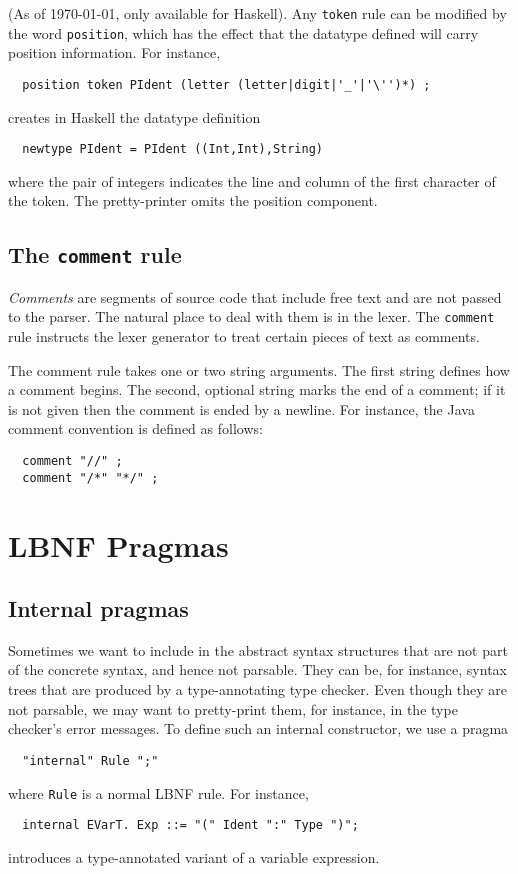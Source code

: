 \documentclass[10pt]{article}
\begin{document}
\label{reg}\label{postoken}

(As of \today, only available for Haskell).
Any {\tt token} rule can be modified by the word
{\tt position}, which has the effect that the
datatype defined will carry position information.
For instance,
\begin{verbatim}
  position token PIdent (letter (letter|digit|'_'|'\'')*) ;
\end{verbatim}
creates in Haskell the datatype definition
\begin{verbatim}
  newtype PIdent = PIdent ((Int,Int),String)
\end{verbatim}
where the pair of integers indicates the line and column of
the first character of the token. The pretty-printer omits
the position component.




\subsection{The {\tt comment} rule}

\textit{Comments} are segments of source code that include free
text and are not passed to the parser. The natural place
to deal with them is in the lexer. The {\tt comment} rule instructs the
lexer generator to treat certain pieces of text as comments. 

The comment rule takes one or two string arguments. The first
string defines how a comment begins.
The second, optional string marks the end of a comment;
if it is not given then the comment is ended by a newline.
For instance, the Java comment convention is defined as follows:
\begin{verbatim}
  comment "//" ;
  comment "/*" "*/" ; 
\end{verbatim}


\section{LBNF Pragmas}
\label{pragmas}

\subsection{Internal pragmas}

Sometimes we want to include in the abstract syntax 
structures that are not part of the concrete syntax, 
and hence not parsable. 
They can be, for instance, syntax trees that are produced by a 
type-annotating type checker.
Even though they are not parsable, we may want to
pretty-print them, for instance, in the type checker's
error messages.
To define such an internal constructor, we use a pragma
\begin{verbatim}
  "internal" Rule ";"
\end{verbatim}
where {\tt Rule} is a normal LBNF rule. For instance,
\begin{verbatim}
  internal EVarT. Exp ::= "(" Ident ":" Type ")";
\end{verbatim}
introduces a type-annotated variant of a variable expression.
\end{document}
